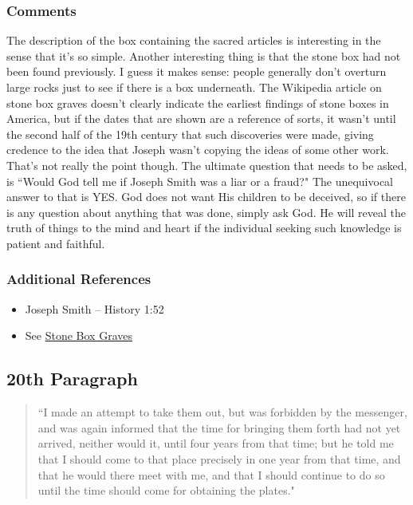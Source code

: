 \documentclass[12pt]{report}
\begin{document}
\subsubsection{Comments\label{js:comments19}}
The description of the box containing the sacred articles is interesting in the sense that it's so simple.  Another interesting thing is that the stone box had not been found previously.  I guess it makes sense: people generally don't overturn large rocks just to see if there is a box underneath.  The Wikipedia article on stone box graves doesn't clearly indicate the earliest findings of stone boxes in America, but if the dates that are shown are a reference of sorts, it wasn't until the second half of the 19th century that such discoveries were made, giving credence to the idea that Joseph wasn't copying the ideas of some other work.  That's not really the point though.  The ultimate question that needs to be asked, is ``Would God tell me if Joseph Smith was a liar or a fraud?"  The unequivocal answer to that is YES.  God does not want His children to be deceived, so if there is any question about anything that was done, simply ask God.  He will reveal the truth of things to the mind and heart if the individual seeking such knowledge is patient and faithful.

\subsubsection{Additional References\label{js:references19}}
\begin{itemize}
\item Joseph Smith -- History 1:52
\item See \href{https://en.wikipedia.org/wiki/Stone_box_grave}{Stone Box Graves}
\end{itemize}

\subsection{20th Paragraph\label{js:20th}}
\begin{center}
\begin{quote}
``I made an attempt to take them out, but was forbidden by the messenger, and was again informed that the time for bringing them forth had not yet arrived, neither would it, until four years from that time; but he told me that I should come to that place precisely in one year from that time, and that he would there meet with me, and that I should continue to do so until the time should come for obtaining the plates."
\end{quote}
\end{center}
\end{document}
